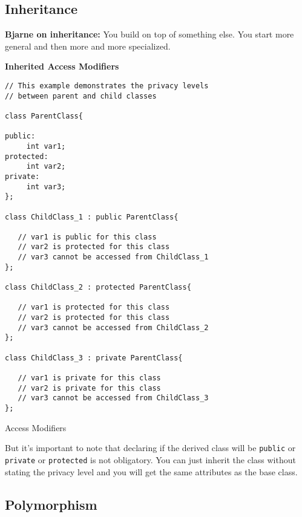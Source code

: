 \documentclass[11pt, a4paper]{article}
\begin{document}
\subsection{Inheritance}%
\label{sub:inheritance}

\textbf{Bjarne on inheritance:} You build on top of something else. You start more general and then more and more specialized. 


\textbf{Inherited Access Modifiers}

\begin{listing}[hbt!]
\begin{verbatim}
// This example demonstrates the privacy levels
// between parent and child classes

class ParentClass{

public:
     int var1;
protected:
     int var2;
private:
     int var3;
};

class ChildClass_1 : public ParentClass{

   // var1 is public for this class
   // var2 is protected for this class
   // var3 cannot be accessed from ChildClass_1
};

class ChildClass_2 : protected ParentClass{

   // var1 is protected for this class
   // var2 is protected for this class
   // var3 cannot be accessed from ChildClass_2
};

class ChildClass_3 : private ParentClass{

   // var1 is private for this class
   // var2 is private for this class
   // var3 cannot be accessed from ChildClass_3
};
\end{verbatim}
\caption{Access Modifiers}
\label{lst:access_modifiers}
\end{listing}

But it's important to note that declaring if the derived class will be \texttt{public} or \texttt{private} or \texttt{protected} is not obligatory. You can just inherit the class without stating the privacy level and you will get the same attributes as the base class.












\subsection{Polymorphism}%
\label{sub:polymorphism}
\end{document}
